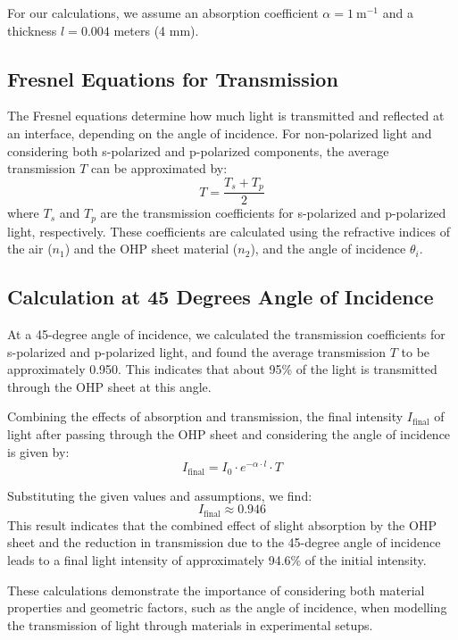 For our calculations, we assume an absorption coefficient \(\alpha = 1\ \text{m}^{-1}\) and a thickness \(l = 0.004\) meters (4 mm).

\subsection*{Fresnel Equations for Transmission}
The Fresnel equations determine how much light is transmitted and reflected at an interface, depending on the angle of incidence. For non-polarized light and considering both s-polarized and p-polarized components, the average transmission \(T\) can be approximated by:
\[ T = \frac{T_s + T_p}{2} \]
where \(T_s\) and \(T_p\) are the transmission coefficients for s-polarized and p-polarized light, respectively. These coefficients are calculated using the refractive indices of the air (\(n_1\)) and the OHP sheet material (\(n_2\)), and the angle of incidence \(\theta_i\).

\subsection*{Calculation at 45 Degrees Angle of Incidence}
At a 45-degree angle of incidence, we calculated the transmission coefficients for s-polarized and p-polarized light, and found the average transmission \(T\) to be approximately 0.950. This indicates that about 95\% of the light is transmitted through the OHP sheet at this angle.

Combining the effects of absorption and transmission, the final intensity \(I_{\text{final}}\) of light after passing through the OHP sheet and considering the angle of incidence is given by:
\[ I_{\text{final}} = I_0 \cdot e^{-\alpha \cdot l} \cdot T \]

Substituting the given values and assumptions, we find:
\[ I_{\text{final}} \approx 0.946 \]
This result indicates that the combined effect of slight absorption by the OHP sheet and the reduction in transmission due to the 45-degree angle of incidence leads to a final light intensity of approximately 94.6\% of the initial intensity.

These calculations demonstrate the importance of considering both material properties and geometric factors, such as the angle of incidence, when modelling the transmission of light through materials in experimental setups.



